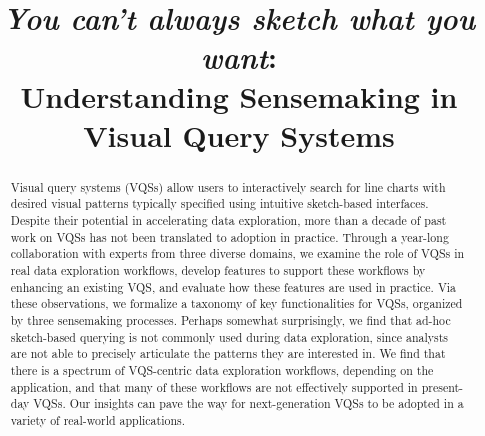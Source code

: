 \documentclass{egpubl}
\begin{document}
\title{\emph{You can't always sketch what you want}: \\ Understanding Sensemaking in Visual Query Systems}

\maketitle

\begin{abstract}
Visual query systems (VQSs) allow users to interactively search for line charts
with desired visual patterns typically specified using intuitive sketch-based interfaces. Despite their potential in accelerating data exploration, more than a decade of past work on VQSs has not been translated to adoption in practice. Through a year-long collaboration with experts from three diverse domains, we examine the role of VQSs in real data exploration workflows,  develop features to support these workflows by enhancing an existing VQS,
and evaluate how these features are used in practice. Via these observations, we formalize a taxonomy of key functionalities for VQSs, organized by three sensemaking processes. Perhaps somewhat surprisingly, we find that ad-hoc sketch-based querying is not commonly used during data exploration, since
analysts are not able to precisely articulate the patterns they are interested in. We find that there is a spectrum of VQS-centric data exploration workflows, depending on the application, and that many of these workflows are not effectively supported in present-day VQSs. Our insights can pave the way for next-generation VQSs to be adopted in a variety of real-world applications.


\end{abstract}
\end{document}

